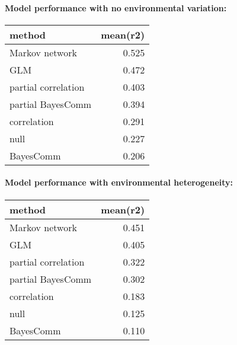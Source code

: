 \documentclass[11pt,]{article}
\newenvironment{Shaded}{\begin{snugshade}}{\end{snugshade}}
\newcommand{\KeywordTok}[1]{\textcolor[rgb]{0.13,0.29,0.53}{\textbf{{#1}}}}
\newcommand{\DataTypeTok}[1]{\textcolor[rgb]{0.13,0.29,0.53}{{#1}}}
\newcommand{\DecValTok}[1]{\textcolor[rgb]{0.00,0.00,0.81}{{#1}}}
\newcommand{\StringTok}[1]{\textcolor[rgb]{0.31,0.60,0.02}{{#1}}}
\newcommand{\NormalTok}[1]{{#1}}
\let\oldparagraph\paragraph
\renewcommand{\paragraph}[1]{\oldparagraph{#1}\mbox{}}
\begin{document}
\paragraph{Model performance with no environmental
variation:}\label{model-performance-with-no-environmental-variation}

\begin{Shaded}
\end{Shaded}

\begin{longtable}[c]{@{}lr@{}}
\toprule
method & mean(r2)\tabularnewline
\midrule
\endhead
Markov network & 0.525\tabularnewline
GLM & 0.472\tabularnewline
partial correlation & 0.403\tabularnewline
partial BayesComm & 0.394\tabularnewline
correlation & 0.291\tabularnewline
null & 0.227\tabularnewline
BayesComm & 0.206\tabularnewline
\bottomrule
\end{longtable}

\paragraph{Model performance with environmental
heterogeneity:}\label{model-performance-with-environmental-heterogeneity}

\begin{Shaded}
\end{Shaded}

\begin{longtable}[c]{@{}lr@{}}
\toprule
method & mean(r2)\tabularnewline
\midrule
\endhead
Markov network & 0.451\tabularnewline
GLM & 0.405\tabularnewline
partial correlation & 0.322\tabularnewline
partial BayesComm & 0.302\tabularnewline
correlation & 0.183\tabularnewline
null & 0.125\tabularnewline
BayesComm & 0.110\tabularnewline
\bottomrule
\end{longtable}
\end{document}
